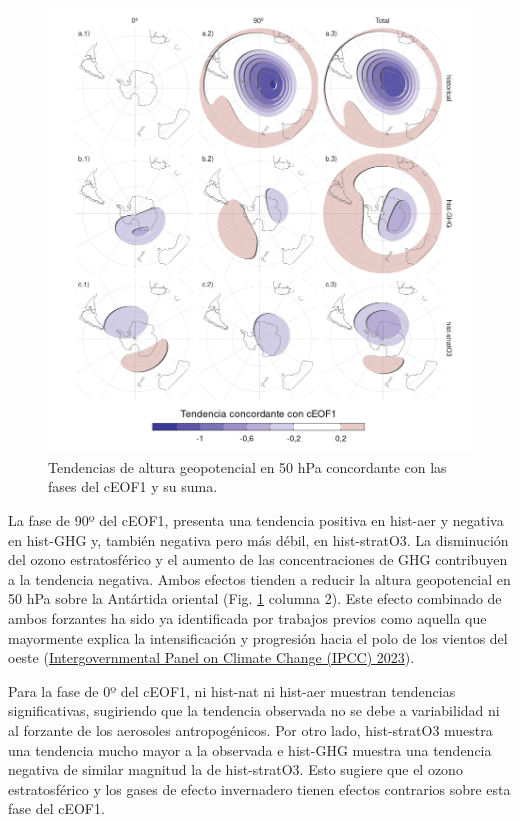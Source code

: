 \documentclass[12pt,oneside,a4paper]{reedthesis}
\begin{document}
\begin{figure}

{\centering \includegraphics{figures/50-cmip6/mapa-trend-1} 

}

\caption{Tendencias de altura geopotencial en 50 hPa concordante con las fases del cEOF1 y su suma.}\label{fig:mapa-trend}
\end{figure}



La fase de 90º del cEOF1, presenta una tendencia positiva en hist-aer y negativa en hist-GHG y, también negativa pero más débil, en hist-stratO3.
La disminución del ozono estratosférico y el aumento de las concentraciones de GHG contribuyen a la tendencia negativa.
Ambos efectos tienden a reducir la altura geopotencial en 50 hPa sobre la Antártida oriental (Fig. \ref{fig:mapa-trend} columna 2).
Este efecto combinado de ambos forzantes ha sido ya identificada por trabajos previos como aquella que mayormente explica la intensificación y progresión hacia el polo de los vientos del oeste (\protect\hyperlink{ref-ipcc6ch3}{Intergovernmental Panel on Climate Change (IPCC) 2023}).

Para la fase de 0º del cEOF1, ni hist-nat ni hist-aer muestran tendencias significativas, sugiriendo que la tendencia observada no se debe a variabilidad ni al forzante de los aerosoles antropogénicos.
Por otro lado, hist-stratO3 muestra una tendencia mucho mayor a la observada e hist-GHG muestra una tendencia negativa de similar magnitud la de hist-stratO3.
Esto sugiere que el ozono estratosférico y los gases de efecto invernadero tienen efectos contrarios sobre esta fase del cEOF1.
\end{document}
